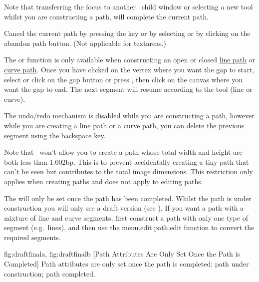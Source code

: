 Note that transferring the focus to
another \FlowframTk\ child window or selecting a new tool whilst you
are constructing a \gls{path}, will complete the current path.


Cancel the current \gls{path} by pressing the
 key or by selecting
 or by clicking on the abandon path button.
(Not applicable for \glspl{textarea}.)


The  or  function is only
available when constructing an open or closed
\hyperref[sec:newlinepath]{line path} or \hyperref[sec:newcurvepath]{curve
path}.  Once you have clicked on the vertex where you want the
\gls{gap} to start, select  or click on the
\gls{gap} button or press , then click
on the \gls{canvas} where you want the \gls{gap} to end. The next
segment will resume according to the tool (line or curve).

\begin{warning}
The undo/redo mechanism is disabled while you are constructing a
path, however while you are creating a line path or a curve path,
you can delete the previous segment using the
backspace  key.
\end{warning}

Note that \FlowframTk\ won't allow you to create a \gls{path} whose
total width and height are both less than 1.002\gls{bp}. This is to
prevent accidentally creating a tiny path that can't be seen but
contributes to the total image dimensions. This restriction only
applies when creating \glspl*{path} and does not apply to editing
paths.

The  will only be set
once the \gls{path} has been completed. Whilst the
\gls{path} is under construction you will
only see a draft version (see ).
If you want a \gls{path} with a mixture of line and curve
segments, first construct a \gls{path} with only one
type of segment (e.g.\ lines), and then use the
\gls{menu.edit.path.edit} function to convert
the required segments.

{
 {fig:draftfinala}{}{},
 {fig:draftfinalb}{}{}
}
[Path Attributes Are Only Set Once the Path is Completed]
{Path attributes are only set once the path is completed:
 path under construction;
 path completed.}


